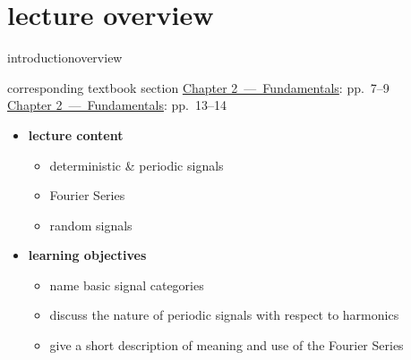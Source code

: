 




\subtitle{Module 2.0: Fundamentals~---~Signals}


	

    \section[overview]{lecture overview}
        \begin{frame}{introduction}{overview}
            \begin{block}{corresponding textbook section}
                    \href{http://ieeexplore.ieee.org/xpl/articleDetails.jsp?tp=&arnumber=6331119&}{Chapter 2~---~Fundamentals}: pp.~7--9\\
                    \href{http://ieeexplore.ieee.org/xpl/articleDetails.jsp?tp=&arnumber=6331119&}{Chapter 2~---~Fundamentals}: pp.~13--14
            \end{block}

            \begin{itemize}
                \item   \textbf{lecture content}
                    \begin{itemize}
                        \item   deterministic \& periodic signals
                        \item   Fourier Series
                        \item   random signals
                    \end{itemize}
                \bigskip
                \item<2->   \textbf{learning objectives}
                    \begin{itemize}
                        \item   name basic signal categories
                        \item   discuss the nature of periodic signals with respect to harmonics
                        \item   give a short description of meaning and use of the Fourier Series
                    \end{itemize}
            \end{itemize}
        \end{frame}
        
